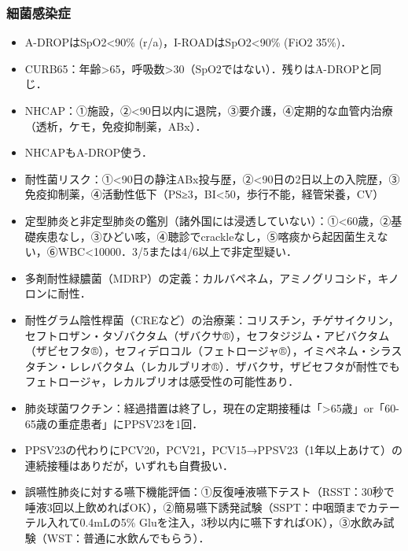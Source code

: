 \subsubsection{細菌感染症}

\begin{itemize}
\item A-DROPはSpO2<90\% (r/a)，I-ROADはSpO2<90\% (FiO2 35\%)．
\item CURB65：年齢>65，呼吸数>30（SpO2ではない）．残りはA-DROPと同じ．
\item NHCAP：①施設，②<90日以内に退院，③要介護，④定期的な血管内治療（透析，ケモ，免疫抑制薬，ABx）．
\item NHCAPもA-DROP使う．
\item 耐性菌リスク：①<90日の静注ABx投与歴，②<90日の2日以上の入院歴，③免疫抑制薬，④活動性低下（PS≥3，BI<50，歩行不能，経管栄養，CV）


\item 定型肺炎と非定型肺炎の鑑別（諸外国には浸透していない）：①<60歳，②基礎疾患なし，③ひどい咳，④聴診でcrackleなし，⑤喀痰から起因菌生えない，⑥WBC<10000．3/5または4/6以上で非定型疑い．
\item 多剤耐性緑膿菌（MDRP）の定義：カルバペネム，アミノグリコシド，キノロンに耐性．
\item 耐性グラム陰性桿菌（CREなど）の治療薬：コリスチン，チゲサイクリン，セフトロザン・タゾバクタム（ザバクサ®），セフタジジム・アビバクタム（ザビセフタ®），セフィデロコル（フェトロージャ®），イミペネム・シラスタチン・レレバクタム（レカルブリオ®）．ザバクサ，ザビセフタが耐性でもフェトロージャ，レカルブリオは感受性の可能性あり．
\item 肺炎球菌ワクチン：経過措置は終了し，現在の定期接種は「>65歳」or「60-65歳の重症患者」にPPSV23を1回．
\item PPSV23の代わりにPCV20，PCV21，PCV15→PPSV23（1年以上あけて）の連続接種はありだが，いずれも自費扱い．


\item 誤嚥性肺炎に対する嚥下機能評価：①反復唾液嚥下テスト（RSST：30秒で唾液3回以上飲めればOK），②簡易嚥下誘発試験（SSPT：中咽頭までカテーテル入れて0.4mLの5\% Gluを注入，3秒以内に嚥下すればOK），③水飲み試験（WST：普通に水飲んでもらう）．
\end{itemize}


